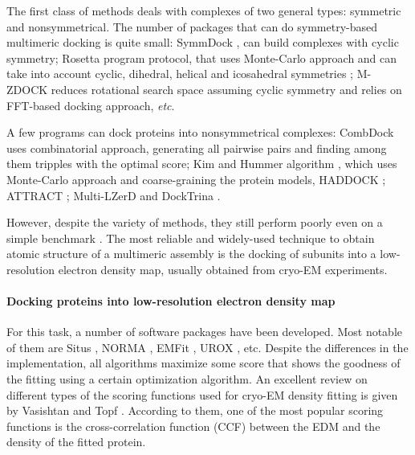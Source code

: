 The first class of methods deals with complexes of two general types: symmetric and nonsymmetrical.
The number of packages that can do symmetry-based multimeric docking is quite small: SymmDock \cite{schneidman2005geometry}, 
can build complexes with cyclic symmetry; Rosetta program protocol, that uses Monte-Carlo approach and can take into account cyclic, dihedral, helical and
icosahedral symmetries \cite{andre2007prediction}; M-ZDOCK \cite{pierce2005m} reduces rotational search space assuming cyclic symmetry and relies on FFT-based docking approach, \emph{etc}.

A few programs can dock proteins into nonsymmetrical complexes: CombDock \cite{inbar2005prediction} uses combinatorial approach, generating all pairwise 
pairs and finding among them tripples with the optimal score; Kim and Hummer algorithm \cite{kim2008coarse}, which uses Monte-Carlo approach and coarse-graining the protein models, 
HADDOCK \cite{dominguez2003haddock}; ATTRACT \cite{zacharias2003protein}; Multi-LZerD \cite{esquivel2012multi} and DockTrina \cite{popov2014docktrina}.

However, despite the variety of methods, they still perform poorly even on a simple benchmark \cite{popov2014docktrina}. The most reliable and widely-used technique 
to obtain atomic structure of a multimeric assembly is the docking of subunits into a low-resolution electron density map, usually obtained from cryo-EM experiments.

\paragraph{Docking proteins into low-resolution electron density map}
For this task, a number of software packages have been developed. 
Most notable of them are Situs \cite{Wriggers2010,Chacon2002}, NORMA \cite{Suhre2006},
EMFit \cite{Rossmann2001}, UROX \cite{Siebert2009}, etc. Despite the
differences in the implementation, all algorithms maximize
some score that shows the goodness of the fitting using a certain
optimization algorithm. An excellent review on different types of
the scoring functions used for cryo-EM density fitting is given by
Vasishtan and Topf \cite{Vasishtan2011}. According to them, one of
the most popular scoring functions is the cross-correlation function
(CCF) between the EDM and the density of the fitted protein. 

